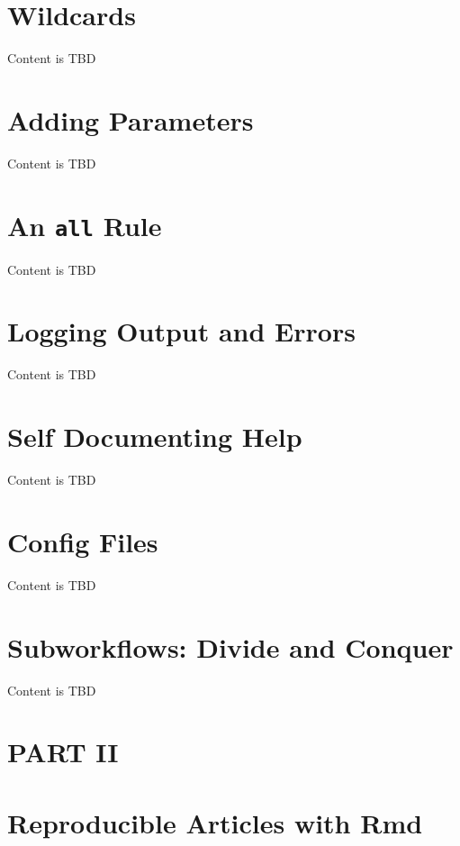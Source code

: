 \documentclass[]{book}
\theoremstyle{definition}
\theoremstyle{definition}
\theoremstyle{definition}
\theoremstyle{remark}
\begin{document}
\chapter{Wildcards}\label{wildcards-1}

Content is TBD

\chapter{Adding Parameters}\label{adding-parameters}

Content is TBD

\chapter{\texorpdfstring{An \texttt{all}
Rule}{An all Rule}}\label{an-all-rule}

Content is TBD

\chapter{Logging Output and Errors}\label{logging-output-and-errors}

Content is TBD

\chapter{Self Documenting Help}\label{self-documenting-help}

Content is TBD

\chapter{Config Files}\label{config-files}

Content is TBD

\chapter{Subworkflows: Divide and
Conquer}\label{subworkflows-divide-and-conquer}

Content is TBD

\chapter*{PART II}\label{part-ii}

\chapter{Reproducible Articles with
Rmd}\label{reproducible-articles-with-rmd}
\end{document}
